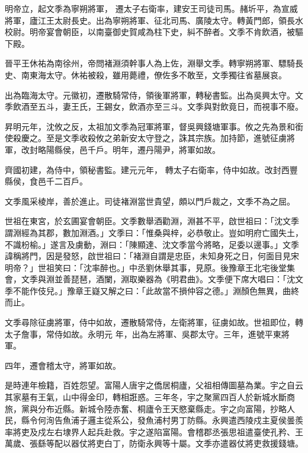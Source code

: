 \begin{pinyinscope}
 明帝立，起文季為寧朔將軍，
 遷太子右衛率，建安王司徒司馬。赭圻平，為宣威將軍，廬江王太尉長史。出為寧朔將軍、征北司馬、廣陵太守。轉黃門郎，領長水校尉。明帝宴會朝臣，以南臺御史賀咸為柱下史，糾不醉者。文季不肯飲酒，被驅下殿。



 晉平王休祐為南徐州，帝問褚淵須幹事人為上佐，淵舉文季。轉寧朔將軍、驃騎長史、南東海太守。休祐被殺，雖用薨禮，僚佐多不敢至，文季獨往省墓展哀。



 出為臨海太守。元徽初，遷散騎常侍，領後軍將軍，轉秘書監。出為吳興太守。文季飲酒至五斗，妻王氏，王錫女，飲酒亦至三斗。文季與對飲竟日，而視事不廢。



 昇明元年，沈攸之反，太祖加文季為冠軍將軍，督吳興錢塘軍事。攸之先為景和銜使殺慶之。至是文季收殺攸之弟新安太守登之，誅其宗族。加持節，進號征虜將軍，改封略陽縣侯，邑千戶。明年，遷丹陽尹，將軍如故。



 齊國初建，為侍中，領秘書監。建元元年，
 轉太子右衛率，侍中如故。改封西豐縣侯，食邑千二百戶。



 文季風采棱岸，善於進止。司徒褚淵當世貴望，頗以門戶裁之，文季不為之屈。



 世祖在東宮，於玄圃宴會朝臣。文季數舉酒勸淵，淵甚不平，啟世祖曰：「沈文季謂淵經為其郡，數加淵酒。」文季曰：「惟桑與梓，必恭敬止。豈如明府亡國失土，不識枌榆。」遂言及虜動，淵曰：「陳顯達、沈文季當今將略，足委以邊事。」文季諱稱將門，因是發怒，啟世祖曰：「褚淵自謂是忠臣，未知身死之日，何面目見宋明帝？」世祖笑曰：「沈率醉也。」中丞劉休舉其事，見原。後豫章王北宅後堂集會，文季與淵並善琵琶，酒闌，淵取樂器為《明君曲》。文季便下席大唱曰：「沈文季不能作伎兒。」豫章王嶷又解之曰：「此故當不損仲容之德。」淵顏色無異，曲終而止。



 文季尋除征虜將軍，侍中如故，遷散騎常侍，左衛將軍，征虜如故。世祖即位，轉太子詹事，常侍如故。永明元
 年，出為左將軍、吳郡太守。三年，進號平東將軍。



 四年，遷會稽太守，將軍如故。



 是時連年檢籍，百姓怨望。富陽人唐宇之僑居桐廬，父祖相傳圖墓為業。宇之自云其家墓有王氣，山中得金印，轉相誑惑。三年冬，宇之聚黨四百人於新城水斷商旅，黨與分布近縣。新城令陸赤奮、桐廬令王天愍棄縣走。宇之向富陽，抄略人民，縣令何洵告魚浦子邏主從系公，發魚浦村男丁防縣。永興遣西陵戍主夏侯曇羨率將吏及戍左右埭界人起兵赴救。宇之遂陷富陽。會稽郡丞張思祖遣臺使孔矜、王萬歲、張繇等配以器仗將吏白丁，防衛永興等十屬。文季亦遣器仗將吏救援錢塘。




\end{pinyinscope}
